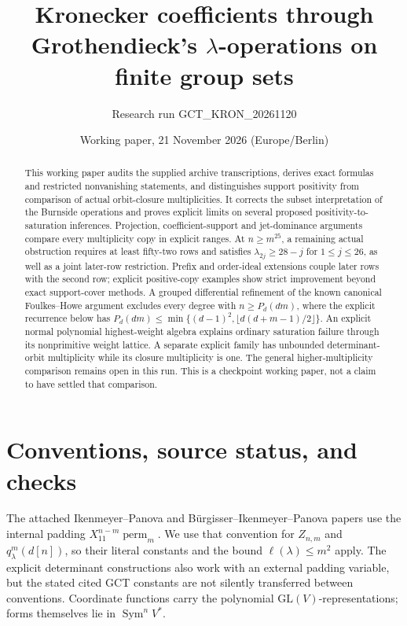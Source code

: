 \documentclass[11pt]{article}
\title{Kronecker coefficients through Grothendieck's\linebreak
\(\lambda\)-operations on finite group sets}
\author{Research run GCT\_KRON\_20261120}
\date{Working paper, 21 November 2026 (Europe/Berlin)}
\begin{document}
\maketitle
\begin{abstract}
This working paper audits the supplied archive transcriptions, derives
exact formulas and restricted nonvanishing statements, and distinguishes
support positivity from comparison of actual orbit-closure multiplicities.
It corrects the subset interpretation of the Burnside operations and proves
explicit limits on several proposed positivity-to-saturation inferences.
Projection, coefficient-support and jet-dominance arguments compare every
multiplicity copy in explicit ranges. At \(n\geq m^{25}\), a remaining
actual obstruction requires at least fifty-two rows and satisfies
\(\lambda_{2j}\geq28-j\) for \(1\leq j\leq26\), as well as a
joint later-row restriction. Prefix and order-ideal extensions couple
later rows with the second row; explicit positive-copy examples show
strict improvement beyond exact support-cover methods. A grouped differential refinement of the
known canonical Foulkes--Howe argument excludes every degree with
\(n\geq P_d(dm)\), where the explicit recurrence below has
\(P_d(dm)\leq\min\{(d-1)^2,\lfloor d(d+m-1)/2\rfloor\}\).
An explicit normal polynomial highest-weight algebra explains ordinary
saturation failure through its nonprimitive weight lattice. A separate
explicit family has unbounded determinant-orbit multiplicity while its
closure multiplicity is one. The general
higher-multiplicity comparison remains open in this run. This is a
checkpoint working paper, not a claim to have settled that comparison.
\end{abstract}

\section*{Conventions, source status, and checks}
The attached Ikenmeyer--Panova and B\"urgisser--Ikenmeyer--Panova papers
use the internal padding \(X_{11}^{n-m}\operatorname{perm}_m\).
We use that convention for \(Z_{n,m}\) and \(q^m_\lambda(d[n])\),
so their literal constants and the bound \(\ell(\lambda)\leq m^2\)
apply. The explicit determinant constructions also work with an external
padding variable, but the stated cited GCT constants are not silently
transferred between conventions. Coordinate functions carry the polynomial
\(\mathrm{GL}(V)\)-representations; forms themselves lie in
\(\operatorname{Sym}^n V^*\).
\end{document}

